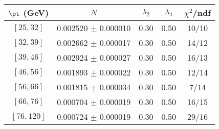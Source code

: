 \begin{tabular}{c||c|c|c|c}
$\pt$ (GeV) & $N$ & $\lambda_{2}$ & $\lambda_4$  & $\chi^2$/ndf  \\
\hline
$[25, 32]$ & 0.002520 $\pm$ 0.000010 & 0.30 & 0.50 & 10/10\\
$[32, 39]$ & 0.002662 $\pm$ 0.000017 & 0.30 & 0.50 & 14/12\\
$[39, 46]$ & 0.002924 $\pm$ 0.000027 & 0.30 & 0.50 & 16/13\\
$[46, 56]$ & 0.001893 $\pm$ 0.000022 & 0.30 & 0.50 & 12/14\\
$[56, 66]$ & 0.001815 $\pm$ 0.000034 & 0.30 & 0.50 & 7/14\\
$[66, 76]$ & 0.000704 $\pm$ 0.000019 & 0.30 & 0.50 & 16/15\\
$[76, 120]$ & 0.000724 $\pm$ 0.000019 & 0.30 & 0.50 & 29/16\\
\end{tabular}
